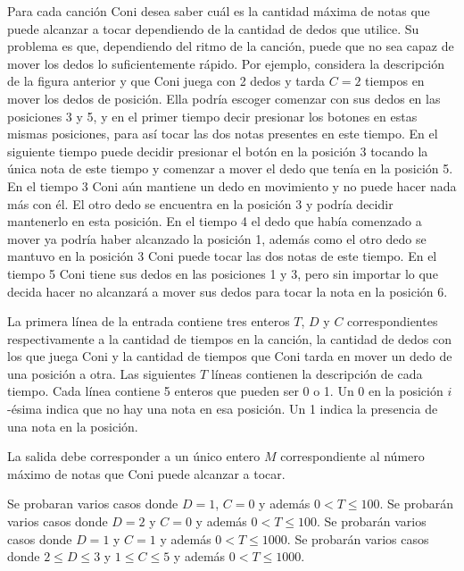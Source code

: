 \documentclass{oci}
\begin{document}
\begin{problemDescription}
  Para cada canción Coni desea saber cuál es la cantidad máxima de notas que
  puede alcanzar a tocar dependiendo de la cantidad de dedos que utilice.
  Su problema es que, dependiendo del ritmo de la canción, puede que no sea
  capaz de mover los dedos lo suficientemente rápido.
  Por ejemplo, considera la descripción de la figura anterior y que Coni juega
  con 2 dedos y tarda $C=2$ tiempos en mover los dedos de posición.
  Ella podría escoger comenzar con sus dedos en las posiciones 3 y 5, y en el
  primer tiempo decir presionar los botones en estas mismas posiciones, para así
  tocar las dos notas presentes en este tiempo.
  En el siguiente tiempo puede decidir presionar el botón en la posición 3
  tocando la única nota de este tiempo y comenzar a mover el dedo que
  tenía en la posición 5.
  En el tiempo 3 Coni aún mantiene un dedo en movimiento y no puede hacer nada
  más con él.
  El otro dedo se encuentra en la posición 3 y podría decidir mantenerlo en esta
  posición.
  En el tiempo 4 el dedo que había comenzado a mover ya podría haber alcanzado
  la posición 1, además como el otro dedo se mantuvo en la posición 3 Coni puede
  tocar las dos notas de este tiempo.
  En el tiempo 5 Coni tiene sus dedos en las posiciones 1 y 3, pero sin importar
  lo que decida hacer no alcanzará a mover sus dedos para tocar la nota en la
  posición 6.
\end{problemDescription}
\begin{inputDescription}
  La primera línea de la entrada contiene tres enteros $T$, $D$ y $C$
  correspondientes respectivamente a la cantidad de tiempos en la canción, la
  cantidad de dedos con los que juega Coni y la cantidad de tiempos que Coni
  tarda en mover un dedo de una posición a otra.
  Las siguientes $T$ líneas contienen la descripción de cada tiempo.
  Cada línea contiene 5 enteros que pueden ser 0 o 1.
  Un 0 en la posición $i$-ésima indica que no hay una nota en esa posición.
  Un 1 indica la presencia de una nota en la posición.
\end{inputDescription}

\begin{outputDescription}
  La salida debe corresponder a un único entero $M$ correspondiente al número
  máximo de notas que Coni puede alcanzar a tocar.
\end{outputDescription}

\begin{scoreDescription}
   Se probaran varios casos donde $D = 1$, $C = 0$ y además $0 < T \le 100$.
   Se probarán varios casos donde $D = 2$ y $C = 0$ y además $0 < T \le 100$.
   Se probarán varios casos donde $D = 1$ y $C = 1$ y además $0 < T \le 1000$.
   Se probarán varios casos donde $2 \le D \le 3$ y $1 \le C \le 5$ y
  además $0 < T \le 1000$.
\end{scoreDescription}

\begin{sampleDescription}
\end{sampleDescription}
\end{document}
